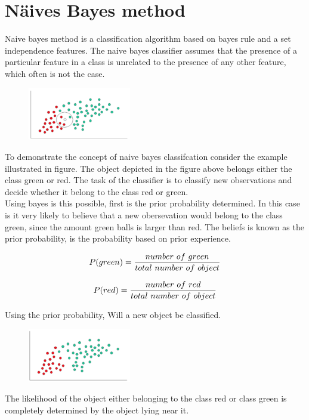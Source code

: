 \documentclass[10pt,a4paper]{article}
\begin{document}
\section{Näives Bayes method}
Naive bayes method is a classification algorithm based on bayes rule and a set independence features. The naive bayes classifier assumes that the presence of a particular feature in a class is unrelated to the presence of any other feature, which often is not the case. 

\begin{figure}[H]
\centering
\includegraphics[width = 0.4\textwidth]{image.png}
\end{figure}


To demonstrate the concept of naive bayes classifcation consider the example illustrated in figure. 
The object depicted in the figure above belongs either the class green or red.  The task of the classifier is to classify new  observations and decide whether it belong to the class red or green. \\

Using bayes is this possible, first is the prior probability determined. In this case is it very likely to believe that a new obersevation would belong to the class green, since the amount green balls is larger than red.  The beliefs is known as the prior probability, is the probability based on prior experience. 

\begin{equation}
\centering
P(green) = \frac{number~of~green}{total~number~of~object}
\end{equation}

\begin{equation}
\centering
P(red) = \frac{number~of~red}{total~number~of~object}
\end{equation}

Using the prior probability, Will  a new object be classified. 

\begin{figure}[H]
\centering
\includegraphics[width = 0.4\textwidth]{image2.png}
\end{figure}
The likelihood of the object either belonging to the class red or class green is completely determined by the object lying near it. 
\end{document}
